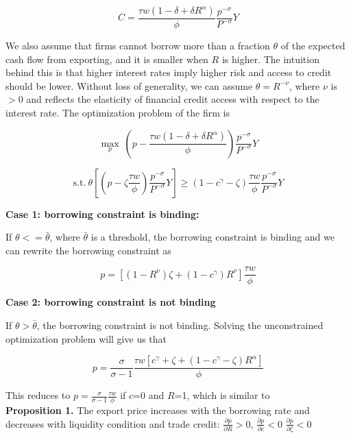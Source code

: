 \begin{equation}
C=\frac{\tau w(1-\delta+\delta R^\alpha)}{\phi} \frac{p^{-\sigma}}{P^{-\sigma}} Y
\end{equation}

We also assume that firms cannot borrow more than a fraction $\theta$ of the expected cash flow from exporting, and it is smaller when $R$ is higher. The intuition behind this is that higher interest rates imply higher risk and access to credit should be lower. Without loss of generality, we can assume $\theta=R^{-\nu}$, where $\nu$ is $>0$ and reflects the elasticity of financial credit access with respect to the interest rate. The optimization problem of the firm is 

$$
\max_{p} \ (p- \frac{\tau w(1-\delta+\delta R^\alpha)}{\phi}) \frac{p^{-\sigma}}{P^{-\sigma}} Y
$$

\begin{equation}
\text{s.t.} \ \theta [(p-\zeta \frac{\tau w}{\phi}) \frac{p^{-\sigma}}{P^{-\sigma}} Y]\geq(1-c^\gamma-\zeta)\frac{\tau w}{\phi} \frac{p^{-\sigma}}{P^{-\sigma}} Y
\end{equation}


\textbf{Case 1: borrowing constraint is binding: }

If $\theta<=\bar{\theta}$, where $\bar{\theta}$ is a threshold, the borrowing constraint is binding and we can rewrite the borrowing constraint as 

\begin{equation}
p=[(1-R^{\nu})\zeta+(1-c^\gamma)R^{\nu}] \frac{\tau w}{\phi}
\end{equation}

\textbf{Case 2: borrowing constraint is not binding}

If $\theta>\bar{\theta}$, the borrowing constraint is not binding. Solving the unconstrained optimization problem will give us that

\begin{equation}
p=\frac{\sigma}{\sigma-1}\frac{\tau w [c^\gamma+\zeta+(1-c^\gamma-\zeta) R^\alpha]}{\phi}
\end{equation}

This reduces to $p=\frac{\sigma}{\sigma-1}\frac{\tau w}{\phi}$ if $c$=0 and $R$=1, which is similar to \cite{melitz2003impact} \\


\textbf{Proposition 1.} The export price increases with the borrowing rate and decreases with liquidity condition and trade credit: $\frac{\partial p}{\partial R}>0$, $\frac{\partial p}{\partial c}<0$ $\frac{\partial p}{\partial \zeta}<0$


